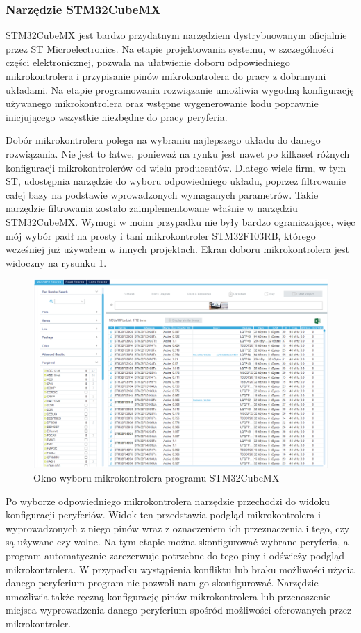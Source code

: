 \subsubsection{Narzędzie STM32CubeMX}
STM32CubeMX jest bardzo przydatnym narzędziem dystrybuowanym oficjalnie przez ST Microelectronics. Na etapie projektowania systemu, w szczególności części elektronicznej, pozwala na ułatwienie doboru odpowiedniego mikrokontrolera i przypisanie pinów mikrokontrolera do pracy z dobranymi układami. Na etapie programowania rozwiązanie umożliwia wygodną konfigurację używanego mikrokontrolera oraz wstępne wygenerowanie kodu poprawnie inicjującego wszystkie niezbędne do pracy peryferia.

Dobór mikrokontrolera polega na wybraniu najlepszego układu do danego rozwiązania. Nie jest to łatwe, ponieważ na rynku jest nawet po kilkaset różnych konfiguracji mikrokontrolerów od wielu producentów. Dlatego wiele firm, w tym ST, udostępnia narzędzie do wyboru odpowiedniego układu, poprzez filtrowanie całej bazy na podstawie wprowadzonych wymaganych parametrów. Takie narzędzie filtrowania zostało zaimplementowane właśnie w narzędziu STM32CubeMX. Wymogi w moim przypadku nie były bardzo ograniczające, więc mój wybór padł na prosty i tani mikrokontroler STM32F103RB, którego wcześniej już używałem w innych projektach. Ekran doboru mikrokontrolera jest widoczny na rysunku \ref{f_cube_micro}.

\begin{figure}[!h]
    \centering
    \includegraphics[width=0.95\linewidth]{img/cube_mcu_select.png} 
    \caption{Okno wyboru mikrokontrolera programu STM32CubeMX} 
    \label{f_cube_micro}
\end{figure}

Po wyborze odpowiedniego mikrokontrolera narzędzie przechodzi do widoku konfiguracji peryferiów. Widok ten przedstawia podgląd mikrokontrolera i wyprowadzonych z niego pinów wraz z oznaczeniem ich przeznaczenia i tego, czy są używane czy wolne. Na tym etapie można skonfigurować wybrane peryferia, a program automatycznie zarezerwuje potrzebne do tego piny i odświeży podgląd mikrokontrolera. W przypadku wystąpienia konfliktu lub braku możliwości użycia danego peryferium program nie pozwoli nam go skonfigurować. Narzędzie umożliwia także ręczną konfigurację pinów mikrokontrolera lub przenoszenie miejsca wyprowadzenia danego peryferium spośród możliwości oferowanych przez mikrokontroler.

